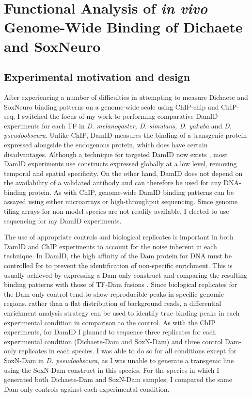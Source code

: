 \chapter{Functional Analysis of \emph{in vivo} Genome-Wide Binding of Dichaete and SoxNeuro}

\hrulefill

\section{Experimental motivation and design}
After experiencing a number of difficulties in attempting to measure Dichaete and SoxNeuro binding patterns on a genome-wide scale using ChIP-chip and ChIP-seq, I switched the focus of my work to performing comparative DamID experiments for each TF in \emph{D. melanogaster, D. simulans, D. yakuba} and \emph{D. pseudoobscura}. Unlike ChIP, DamID measures the binding of a transgenic protein expressed alongside the endogenous protein, which does have certain disadvantages. Although a technique for targeted DamID now exists \citep{southall_cell-type-specific_2013}, most DamID experiments use constructs expressed globally at a low level, removing temporal and spatial specificity. On the other hand, DamID does not depend on the availability of a validated antibody and can therefore be used for any DNA-binding protein. As with ChIP, genome-wide DamID binding patterns can be assayed using either microarrays or high-throughput sequencing. Since genome tiling arrays for non-model species are not readily available, I elected to use sequencing for my DamID experiments.

The use of appropriate controls and biological replicates is important in both DamID and ChIP experiments to account for the noise inherent in each technique. In DamID, the high affinity of the Dam protein for DNA must be controlled for to prevent the identification of non-specific enrichment. This is usually achieved by expressing a Dam-only construct and comparing the resulting binding patterns with those of TF-Dam fusions \citep{greil_[16]_2006, vogel_detection_2007}. Since biological replicates for the Dam-only control tend to show reproducible peaks in specific genomic regions, rather than a flat distribution of background reads, a differential enrichment analysis strategy can be used to identify true binding peaks in each experimental condition in comparison to the control. As with the ChIP experiments, for DamID I planned to sequence three replicates for each experimental condition (Dichaete-Dam and SoxN-Dam) and three control Dam-only replicates in each species. I was able to do so for all conditions except for SoxN-Dam in \emph{D. pseudoobscura}, as I was unable to generate a transgenic line using the SoxN-Dam construct in this species. For the species in which I generated both Dichaete-Dam and SoxN-Dam samples, I compared the same Dam-only controls against each experimental condition.

